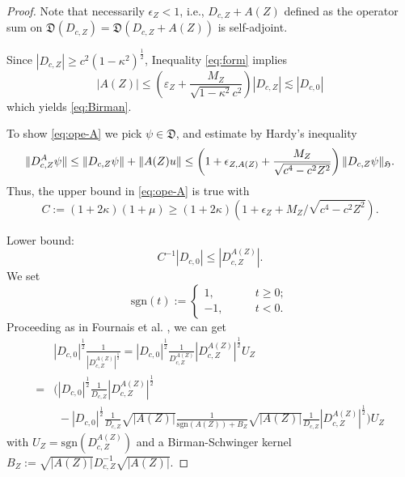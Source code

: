 \documentclass[a4paper]{amsart}
\def\eps{\varepsilon}
\def\gD{\mathfrak{D}}
\def\gH{\mathfrak{H}}
\def\sgn{\mathrm{sgn}} %
\begin{document}
\begin{proof}
  Note that necessarily $\epsilon_{Z}<1$, i.e., $D_{c,Z}+A(Z)$
  defined as the operator sum on $\gD(D_{c,Z})=\gD(D_{c,Z}+A(Z))$ is
  self-adjoint.

  Since $|D_{c,Z}|\geq c^2(1-\kappa^2)^\frac12$, Inequality
  \eqref{eq:form} implies
  \begin{equation}
      |A(Z)|\leq \left(\eps_Z+\frac{M_Z}{\sqrt{1-\kappa^2}c^2} \right)|D_{c,Z}|\lesssim |D_{c,0}|
    \end{equation}
    which yields \eqref{eq:Birman}.
  
    To show \eqref{eq:ope-A} we pick $\psi\in\gD$,  and estimate
    by Hardy's inequality
\begin{equation}
  \|D_{c,Z}^A\psi\|\leq \|D_{c,Z} \psi\|+\|A(Z) u\|
                      \leq  \left(1+\epsilon_{Z,A(Z)}+ {M_{Z}\over\sqrt{c^4-c^2Z^2}}\right)\|D_{c,Z} \psi\|_{\gH}.
  \end{equation}
  Thus, the upper bound in \eqref{eq:ope-A} is true with
  $$C:=(1+2\kappa)(1+\mu)\geq (1+2\kappa)\left(1+\epsilon_{Z}+
    M_{Z}/\sqrt{c^4-c^2Z^2}\right).$$

  Lower bound:
  \begin{equation}\label{eq:2.12}
    C^{-1}|D_{c,0}|\leq |D_{c,Z}^{A(Z)}|.
\end{equation}
We set
\begin{equation}
  \label{signum}
    \sgn(t):=\begin{cases}
        1, \qquad &t\geq 0;\\
        -1,\qquad & t<0.
    \end{cases}
\end{equation}
Proceeding as in Fournais et al. \cite[Below
(31)]{Fournaisetal2020}, we can get
\begin{equation}
  \begin{split}
  &|D_{c,0}|^{\frac12}{\frac{1}{|D_{c,Z}^{A(Z)}|^{\frac12} }} = |D_{c,0}|^{\frac12}{\frac{1}{D_{c,Z}^{A(Z)}}}|D_{c,Z}^{A(Z)}|^{\frac12} U_Z\\
  =&\Big( |D_{c,0}|^{{\frac12}}{\frac{1}{D_{c,Z}}}|D_{c,Z}^{A(Z)}|^{\frac12}\\
  &\phantom{\Big(}-|D_{c,0}|^{\frac12} {\frac{1}{D_{c,Z}} }\sqrt{|A(Z)|}{\frac{1}{ \sgn(A(Z))+B_Z}}\sqrt{|A(Z)|}
  {\frac{1}{D_{c,Z}}}|D_{c,Z}^{A(Z)}|^{\frac12}\Big) U_Z
  \end{split}
\end{equation}
with $U_Z=\sgn(D_{c,Z}^{A(Z)})$ and a Birman-Schwinger kernel
$B_Z:=\sqrt{|A(Z)|} D_{c,Z}^{-1}\sqrt{|A(Z)|}$.


\end{proof}
\end{document}
